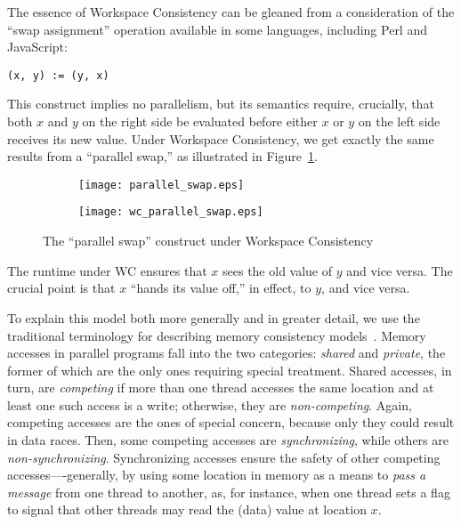 The essence of Workspace Consistency can be gleaned from a consideration of the ``swap assignment'' operation available in some languages, including Perl and JavaScript:
\begin{small}
\begin{verbatim}
(x, y) := (y, x)
\end{verbatim}
\end{small}
%
This construct implies no parallelism, but its semantics require, crucially, that both $x$ and $y$ on the right side be evaluated before either $x$ or $y$ on the left side receives its new value.  Under Workspace Consistency, we get exactly the same results from a ``parallel swap,'' as illustrated in 
Figure~\ref{subfig:design-parallel-swap}.
%
\begin{figure}[htpb]
\begin{subfigure}[b]{0.35\textwidth}
\centering
\texttt{[image: parallel\_swap.eps]}
\label{subfig:design-parallel-swap}
\end{subfigure}
\hspace{1cm}
\begin{subfigure}[b]{0.45\textwidth}
\centering
\texttt{[image: wc\_parallel\_swap.eps]}
\label{subfig:design-wc-parallel-swap}
\end{subfigure}
\caption{The ``parallel swap'' construct under Workspace Consistency}
\label{fig:design-parallel-swap}
\end{figure}
%
The runtime under WC ensures that $x$ sees the old value of $y$ and vice versa.
The crucial point is that $x$ ``hands its value off,'' in effect, to $y$, and vice versa.  


To explain 
this model both more generally and in greater detail, we use the traditional terminology for describing memory consistency models~\cite{gharachorloo90memory, mosberger93mcm}.  Memory accesses in parallel programs fall into the two categories: \textit{shared} and \textit{private}, the former of which are the only ones requiring special treatment.  Shared accesses, in turn, are \textit{competing} if more than one thread accesses the same location and at least one such access is a write; otherwise, they are \textit{non-competing}.  Again, competing accesses are the ones of special concern, because only they could result in data races.   Then, some competing accesses are \textit{synchronizing}, while others are \textit{non-synchronizing}.  Synchronizing accesses ensure the safety of other competing accesses----generally, by using some location in memory as a means to \textit{pass a message} from one thread to another, as, for instance, when one thread sets a flag to signal that other threads may read the (data) value at location $x$. 

